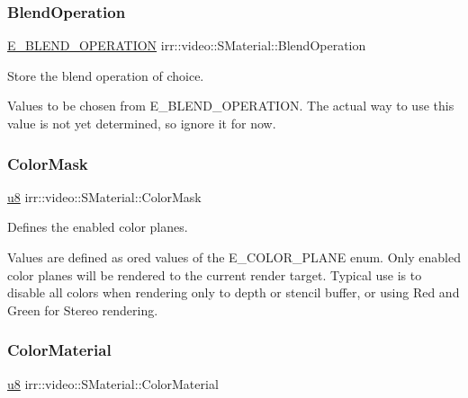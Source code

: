 \subsubsection{\texorpdfstring{Blend\+Operation}{BlendOperation}}
{\footnotesize\ttfamily \hyperlink{namespaceirr_1_1video_a6d78c1faed23a03e8ef7b7b623bbaf2f}{E\+\_\+\+B\+L\+E\+N\+D\+\_\+\+O\+P\+E\+R\+A\+T\+I\+ON} irr\+::video\+::\+S\+Material\+::\+Blend\+Operation}



Store the blend operation of choice. 

Values to be chosen from E\+\_\+\+B\+L\+E\+N\+D\+\_\+\+O\+P\+E\+R\+A\+T\+I\+ON. The actual way to use this value is not yet determined, so ignore it for now. \mbox{\label{classirr_1_1video_1_1SMaterial_a5a4833b515b453c592224d89356dbc01}} 
\subsubsection{\texorpdfstring{Color\+Mask}{ColorMask}}
{\footnotesize\ttfamily \hyperlink{namespaceirr_a646874f69af8ff87fc10201b0254a761}{u8} irr\+::video\+::\+S\+Material\+::\+Color\+Mask}



Defines the enabled color planes. 

Values are defined as or\textquotesingle{}ed values of the E\+\_\+\+C\+O\+L\+O\+R\+\_\+\+P\+L\+A\+NE enum. Only enabled color planes will be rendered to the current render target. Typical use is to disable all colors when rendering only to depth or stencil buffer, or using Red and Green for Stereo rendering. \mbox{\label{classirr_1_1video_1_1SMaterial_a127d0d7a428cb9e5450f2e448b7652ae}} 
\subsubsection{\texorpdfstring{Color\+Material}{ColorMaterial}}
{\footnotesize\ttfamily \hyperlink{namespaceirr_a646874f69af8ff87fc10201b0254a761}{u8} irr\+::video\+::\+S\+Material\+::\+Color\+Material}



